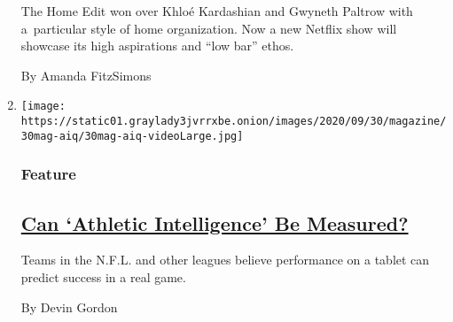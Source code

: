 \begin{enumerate}
  The Home Edit won over Khloé Kardashian and Gwyneth Paltrow with
  a~particular style of home organization. Now a new Netflix show will
  showcase its high aspirations and ``low bar'' ethos.

  By Amanda FitzSimons
\item
  \texttt{[image: https://static01.graylady3jvrrxbe.onion/images/2020/09/30/magazine/30mag-aiq/30mag-aiq-videoLarge.jpg]}

  \hypertarget{feature}{%
  \subsubsection{Feature}\label{feature}}

  \hypertarget{can-athletic-intelligence-be-measured}{%
  \subsection{\texorpdfstring{\href{/2020/09/02/magazine/athletic-intelligence.html}{Can
  `Athletic Intelligence' Be
  Measured?}}{Can `Athletic Intelligence' Be Measured?}}\label{can-athletic-intelligence-be-measured}}

  Teams in the N.F.L. and other leagues believe performance on a tablet
  can predict success in a real game.

  By Devin Gordon
\end{enumerate}


